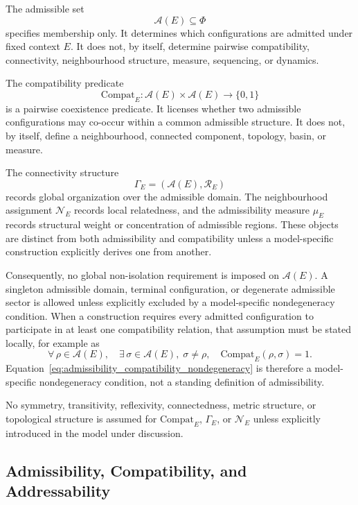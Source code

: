 \documentclass[aps,prx,onecolumn,11pt]{revtex4-2}
\theoremstyle{plain}
\theoremstyle{definition}
\theoremstyle{remark}
\begin{document}
The admissible set
\[
\mathcal{A}(E)\subseteq\Phi
\]
specifies membership only. It determines which configurations are
admitted under fixed context $E$. It does not, by itself, determine
pairwise compatibility, connectivity, neighbourhood structure, measure,
sequencing, or dynamics.

The compatibility predicate
\[
\mathrm{Compat}_E:
\mathcal{A}(E)\times\mathcal{A}(E)
\to
\{0,1\}
\]
is a pairwise coexistence predicate. It licenses whether two admissible
configurations may co-occur within a common admissible structure. It
does not, by itself, define a neighbourhood, connected component,
topology, basin, or measure.

The connectivity structure
\[
\Gamma_E=(\mathcal{A}(E),\mathcal{R}_E)
\]
records global organization over the admissible domain. The
neighbourhood assignment $\mathcal{N}_E$ records local relatedness, and
the admissibility measure $\mu_E$ records structural weight or
concentration of admissible regions. These objects are distinct from
both admissibility and compatibility unless a model-specific
construction explicitly derives one from another.

Consequently, no global non-isolation requirement is imposed on
$\mathcal{A}(E)$. A singleton admissible domain, terminal configuration,
or degenerate admissible sector is allowed unless explicitly excluded by
a model-specific nondegeneracy condition. When a construction requires
every admitted configuration to participate in at least one
compatibility relation, that assumption must be stated locally, for
example as
\begin{equation}
\forall\, \rho \in \mathcal{A}(E),\quad
\exists\, \sigma \in \mathcal{A}(E),\; \sigma \neq \rho,\quad
\mathrm{Compat}_E(\rho, \sigma) = 1.
\label{eq:admissibility_compatibility_nondegeneracy}
\end{equation}
Equation~\eqref{eq:admissibility_compatibility_nondegeneracy} is
therefore a model-specific nondegeneracy condition, not a standing
definition of admissibility.

No symmetry, transitivity, reflexivity, connectedness, metric
structure, or topological structure is assumed for
$\mathrm{Compat}_E$, $\Gamma_E$, or $\mathcal{N}_E$ unless explicitly
introduced in the model under discussion.

\subsection{Admissibility, Compatibility, and Addressability}
\label{subsec:admissibility_commitment}
\end{document}
